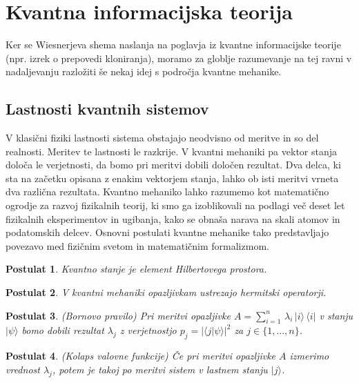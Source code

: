 \documentclass[12pt]{article}
\newtheorem{postulat}{Postulat}
\begin{document}
\section{Kvantna informacijska teorija}
\par Ker se Wiesnerjeva shema naslanja na poglavja iz kvantne informacijske teorije (npr. izrek o prepovedi kloniranja), moramo za globlje razumevanje na tej ravni v nadaljevanju razložiti še nekaj idej s področja kvantne mehanike.

\subsection{Lastnosti kvantnih sistemov}

V klasični fiziki lastnosti sistema obstajajo neodvisno od meritve in so del realnosti. Meritev te lastnosti le razkrije. V kvantni mehaniki pa vektor stanja določa le verjetnosti, da bomo pri meritvi dobili določen rezultat. Dva delca, ki sta na začetku opisana z enakim vektorjem stanja, lahko ob isti meritvi vrneta dva različna rezultata. Kvantno mehaniko lahko razumemo kot matematično ogrodje za razvoj fizikalnih teorij, ki smo ga izoblikovali na podlagi več deset let fizikalnih eksperimentov in ugibanja, kako se obnaša narava na skali atomov in podatomskih delcev. Osnovni postulati kvantne mehanike tako predstavljajo povezavo med fizičnim svetom in matematičnim formalizmom. \cite{zitkoKvantneRacunalniskeTehnologije2017}

\begin{postulat}
Kvantno stanje je element Hilbertovega prostora.
\end{postulat}

\begin{postulat}
V kvantni mehaniki opazljivkam ustrezajo hermitski operatorji.
\end{postulat}

\begin{postulat}
(Bornovo pravilo) Pri meritvi opazljivke $A = \sum_{i = 1}^{n} \, \lambda_i \, | i \rangle \, \langle i |$ v stanju $| \psi \rangle$ bomo dobili rezultat $\lambda_j$ z verjetnostjo $p_j = | \langle j | \psi \rangle |^2$ za $j \in \{1,...,n\}$.
\end{postulat}

\begin{postulat}
(Kolaps valovne funkcije) Če pri meritvi opazljivke $A$ izmerimo vrednost $\lambda_j$, potem je takoj po meritvi sistem v lastnem stanju $| j \rangle$.
\end{postulat}
\end{document}
